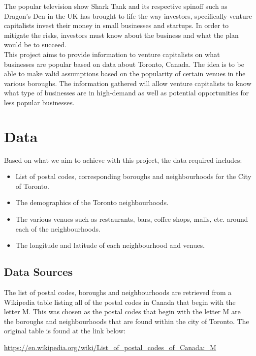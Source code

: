 \documentclass[12pt, conference]{IEEEtran}
\begin{document}
The popular television show Shark Tank and its respective spinoff such as Dragon's Den in the UK has brought to life the way investors, specifically venture capitalists invest their money in small businesses and startups. In order to mitigate the risks, investors must know about the business and what the plan would be to succeed.\\

This project aims to provide information to venture capitalists on what businesses are popular based on data about Toronto, Canada. The idea is to be able to make valid assumptions based on the popularity of certain venues in the various boroughs. The information gathered will allow venture capitalists to know what type of businesses are in high-demand as well as potential opportunities for less popular businesses.

\section{\textbf{Data}}
\label{sec: Data}
Based on what we aim to achieve with this project, the data required includes:
\begin{itemize}
\item List of postal codes, corresponding boroughs and neighbourhoods for the City of Toronto.
\item The demographics of the Toronto neighbourhoods.
\item The various venues such as restaurants, bars, coffee shops, malls, etc. around each of the neighbourhoods.
\item The longitude and latitude of each neighbourhood and venues.
\end{itemize}

\subsection{\textbf{Data Sources}}
\label{sec: Data Sources}
The list of postal codes, boroughs and neighbourhoods are retrieved from a Wikipedia table listing all of the postal codes in Canada that begin with the letter M. This was chosen as the postal codes that begin with the letter M are the boroughs and neighbourhoods that are found within the city of Toronto. The original table is found at the link below:

\begin{center}
\url{https://en.wikipedia.org/wiki/List_of_postal_codes_of_Canada:_M}
\end{center}
\end{document}
